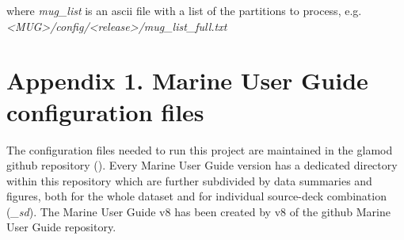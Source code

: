 \documentclass[letterpaper,10pt,english]{sphinxmanual}
\begin{document}
where \textit{mug\_list} is an ascii file with a list of the  partitions to process, e.g. \textit{<MUG>/config/<release>/mug\_list\_full.txt}



\chapter{Appendix 1. Marine User Guide configuration files}
\label{\detokenize{index:appendix-1-marine-user-guide-configuration-files}}\label{\detokenize{index:appendix}}
The configuration files needed to run this project are maintained in the glamod github repository (). 
Every Marine User Guide version has a dedicated directory within this repository which are further subdivided by data summaries and figures, both for the whole dataset and for individual source-deck combination (\textit{\_sd}).
The Marine User Guide v8 has been created by v8 of the github Marine User Guide repository.
\end{document}
